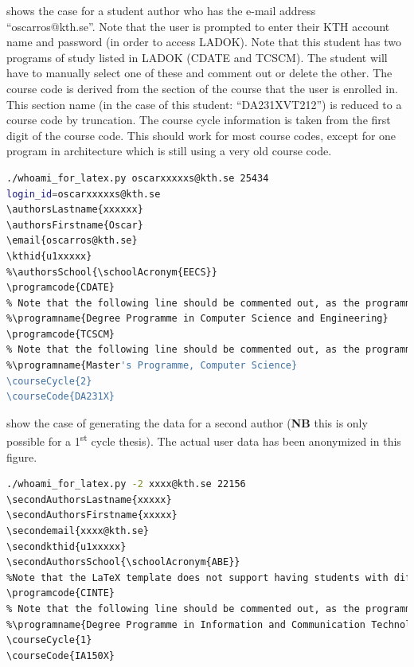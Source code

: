  shows the case for a student author who has the e-mail address “oscarros@kth.se”. Note that the user is prompted to enter their KTH account name and password (in order to access LADOK). Note that this student has two programs of study listed in LADOK (\ie CDATE and TCSCM). The student will have to manually select one of these and comment out or delete the other. The course code is derived from the section of the course that the user is enrolled in. This section name (in the case of this student: “DA231XVT212”) is reduced to a course code by truncation. The course cycle information is taken from the first digit of the course code. This should work for most course codes, except for one program in architecture which is still using a very old course code.
\begin{lstlisting}[language={bash}, caption={Generating \LaTeX~commands for a student author}, label=lst:whoami]
./whoami_for_latex.py oscarxxxxxs@kth.se 25434
login_id=oscarxxxxxs@kth.se
\authorsLastname{xxxxxx}
\authorsFirstname{Oscar}
\email{oscarros@kth.se}
\kthid{u1xxxxx}
%\authorsSchool{\schoolAcronym{EECS}}
\programcode{CDATE}
% Note that the following line should be commented out, as the programme is derived from the school_and_Programs.ins information
%\programname{Degree Programme in Computer Science and Engineering}
\programcode{TCSCM}
% Note that the following line should be commented out, as the programme is derived from the school_and_Programs.ins information
%\programname{Master's Programme, Computer Science}
\courseCycle{2}
\courseCode{DA231X}
\end{lstlisting}

 show the case of generating the data for a second author (\textbf{NB} this is only possible for a 1\textsuperscript{st} cycle thesis). The actual user data has been anonymized in this figure.
\begin{lstlisting}[language={bash}, caption={Generating the \LaTeX~data for the second author (in the case of a 1\textsuperscript{st} cycle thesis)}, label=lst:whoami2]
./whoami_for_latex.py -2 xxxx@kth.se 22156
\secondAuthorsLastname{xxxxx}
\secondAuthorsFirstname{xxxxx}
\secondemail{xxxx@kth.se}
\secondkthid{u1xxxxx}
\secondAuthorsSchool{\schoolAcronym{ABE}}
%Note that the LaTeX template does not support having students with different programs or course codes
\programcode{CINTE}
% Note that the following line should be commented out, as the programme is derived from the school_and_Programs.ins information
%\programname{Degree Programme in Information and Communication Technology}
\courseCycle{1}
\courseCode{IA150X}
\end{lstlisting}


